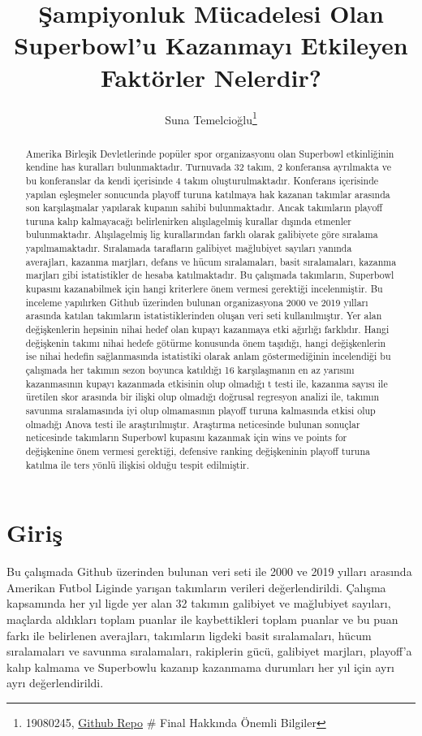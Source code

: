 \documentclass[
  12pt,
]{article}
\title{Şampiyonluk Mücadelesi Olan Superbowl'u Kazanmayı Etkileyen Faktörler Nelerdir?}
\author{Suna Temelcioğlu\footnote{19080245, \href{https://github.com/Sunatemelcioglu}{Github Repo}
  \# Final Hakkında Önemli Bilgiler}}
\date{}
\begin{document}
\maketitle
\begin{abstract}
Amerika Birleşik Devletlerinde popüler spor organizasyonu olan Superbowl etkinliğinin kendine has kuralları bulunmaktadır. Turnuvada 32 takım, 2 konferansa ayrılmakta ve bu konferanslar da kendi içerisinde 4 takım oluşturulmaktadır. Konferans içerisinde yapılan eşleşmeler sonucunda playoff turuna katılmaya hak kazanan takımlar arasında son karşılaşmalar yapılarak kupanın sahibi bulunmaktadır. Ancak takımların playoff turuna kalıp kalmayacağı belirlenirken alışılagelmiş kurallar dışında etmenler bulunmaktadır. Alışılagelmiş lig kurallarından farklı olarak galibiyete göre sıralama yapılmamaktadır. Sıralamada tarafların galibiyet mağlubiyet sayıları yanında averajları, kazanma marjları, defans ve hücum sıralamaları, basit sıralamaları, kazanma marjları gibi istatistikler de hesaba katılmaktadır. Bu çalışmada takımların, Superbowl kupasını kazanabilmek için hangi kriterlere önem vermesi gerektiği incelenmiştir. Bu inceleme yapılırken Github üzerinden bulunan organizasyona 2000 ve 2019 yılları arasında katılan takımların istatistiklerinden oluşan veri seti kullanılmıştır.
Yer alan değişkenlerin hepsinin nihai hedef olan kupayı kazanmaya etki ağırlığı farklıdır. Hangi değişkenin takımı nihai hedefe götürme konusunda önem taşıdığı, hangi değişkenlerin ise nihai hedefin sağlanmasında istatistiki olarak anlam göstermediğinin incelendiği bu çalışmada her takımın sezon boyunca katıldığı 16 karşılaşmanın en az yarısını kazanmasının kupayı kazanmada etkisinin olup olmadığı t testi ile, kazanma sayısı ile üretilen skor arasında bir ilişki olup olmadığı doğrusal regresyon analizi ile, takımın savunma sıralamasında iyi olup olmamasının playoff turuna kalmasında etkisi olup olmadığı Anova testi ile araştırılmıştır.
Araştırma neticesinde bulunan sonuçlar neticesinde takımların Superbowl kupasını kazanmak için wins ve points for değişkenine önem vermesi gerektiği, defensive ranking değişkeninin playoff turuna katılma ile ters yönlü ilişkisi olduğu tespit edilmiştir.
\end{abstract}

\hypertarget{giriux15f}{%
\section{Giriş}\label{giriux15f}}

Bu çalışmada Github üzerinden bulunan veri seti ile 2000 ve 2019 yılları arasında Amerikan Futbol Liginde yarışan takımların verileri değerlendirildi. Çalışma kapsamında her yıl ligde yer alan 32 takımın galibiyet ve mağlubiyet sayıları, maçlarda aldıkları toplam puanlar ile kaybettikleri toplam puanlar ve bu puan farkı ile belirlenen averajları, takımların ligdeki basit sıralamaları, hücum sıralamaları ve savunma sıralamaları, rakiplerin gücü, galibiyet marjları, playoff'a kalıp kalmama ve Superbowlu kazanıp kazanmama durumları her yıl için ayrı ayrı değerlendirildi.
\end{document}
